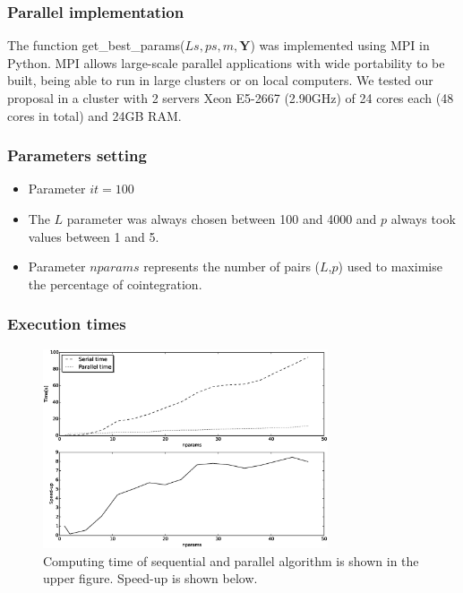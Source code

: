 \documentclass[compress,red]{beamer}
\begin{document}
\begin{frame}
\frametitle{Parallel implementation}
The function get\_best\_params($Ls,ps,m,\mathbf{Y}$) was implemented using MPI in Python. MPI allows large-scale parallel applications
with wide portability to be built, being able to run in large clusters
or on local computers.
We tested our proposal in a cluster with 2 servers Xeon E5-2667 (2.90GHz)
of 24 cores each (48 cores in total) and 24GB RAM.
\end{frame}

\begin{frame}
\frametitle{Parameters setting}
\begin{itemize}
\item Parameter $it=100$
\item The $L$ parameter was always chosen between 100 and 4000 and $p$ always took values
between 1 and 5. 
\item Parameter $nparams$ represents the number of pairs ($L$,$p$) used to maximise the percentage of cointegration. 
\end{itemize}
\end{frame}

\begin{frame}
\frametitle{Execution times}
\begin{figure}[ht]
  \centering
  \includegraphics[width=0.75\textwidth]{img/extimes}
  \caption{Computing time of sequential and parallel algorithm is shown in the
  upper figure. Speed-up is shown below.}
  \label{fig:extimes}
\end{figure}

\end{frame}
\end{document}
